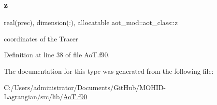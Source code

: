 \mbox{\label{structaot__mod_1_1aot__class_a93f7b7406cbec91c69fdac5bc3505522}} 
\subsubsection{\texorpdfstring{z}{z}}
{\footnotesize\ttfamily real(prec), dimension(\+:), allocatable aot\+\_\+mod\+::aot\+\_\+class\+::z\hspace{0.3cm}{\ttfamily [private]}}



coordinates of the Tracer 



Definition at line 38 of file Ao\+T.\+f90.



The documentation for this type was generated from the following file\+:\begin{DoxyCompactItemize}
\item 
C\+:/\+Users/administrator/\+Documents/\+Git\+Hub/\+M\+O\+H\+I\+D-\/\+Lagrangian/src/lib/\mbox{\hyperlink{_ao_t_8f90}{Ao\+T.\+f90}}\end{DoxyCompactItemize}
